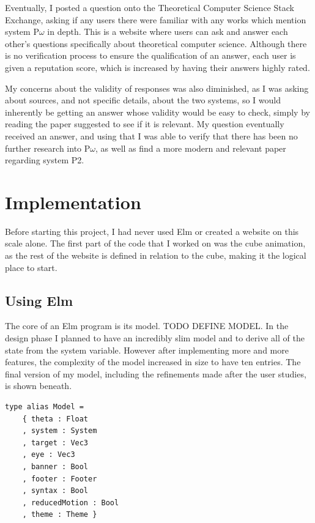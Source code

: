 \documentclass{l4proj}
\begin{document}
Eventually, I posted a question onto the Theoretical Computer Science Stack Exchange, asking if any users there were familiar with any works which mention system P\underline{$\omega$} in depth. This is a website where users can ask and answer each other's questions specifically about theoretical computer science.  Although there is no verification process to ensure the qualification of an answer, each user is given a reputation score, which is increased by having their answers highly rated.  

My concerns about the validity of responses was also diminished, as I was asking about sources, and not specific details, about the two systems, so I would inherently be getting an answer whose validity would be easy to check, simply by reading the paper suggested to see if it is relevant.  My question eventually received an answer, and using that I was able to verify that there has been no further research into P\underline{$\omega$}, as well as find a more modern and relevant paper regarding system P2.


\chapter{Implementation}

Before starting this project, I had never used Elm or created a website on this scale alone.  The first part of the code that I worked on was the cube animation, as the rest of the website is defined in relation to the cube, making it the logical place to start.

\section{Using Elm}

The core of an Elm program is its model.  TODO DEFINE MODEL.  In the design phase I planned to have an incredibly slim model and to derive all of the state from the system variable.  However after implementing more and more features, the complexity of the model increased in size to have ten entries.  The final version of my model, including the refinements made after the user studies, is shown beneath.

\begin{lstlisting}
type alias Model =
    { theta : Float
    , system : System
    , target : Vec3
    , eye : Vec3
    , banner : Bool
    , footer : Footer
    , syntax : Bool
    , reducedMotion : Bool
    , theme : Theme }
\end{lstlisting}
\end{document}
